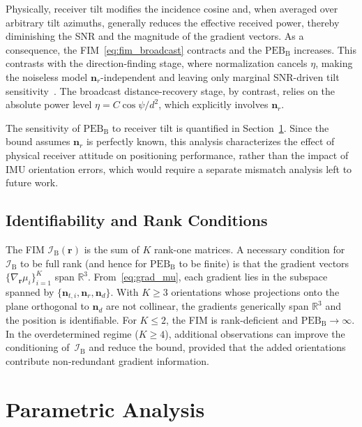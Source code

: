 \documentclass[conference]{IEEEtran}
\begin{document}
Physically, receiver tilt modifies the incidence cosine and, when averaged over arbitrary tilt azimuths, generally reduces the effective received power, thereby diminishing the SNR and the magnitude of the gradient vectors.
As a consequence, the FIM~\eqref{eq:fim_broadcast} contracts and the $\mathrm{PEB}_\mathrm{B}$ increases.
This contrasts with the direction-finding stage, where normalization cancels $\eta$, making the noiseless model $\mathbf{n}_r$-independent and leaving only marginal SNR-driven tilt sensitivity~\cite{AcunaTCOM2025}.
The broadcast distance-recovery stage, by contrast, relies on the absolute power level $\eta = C\cos\psi/d^2$, which explicitly involves $\mathbf{n}_r$.

The sensitivity of $\mathrm{PEB}_\mathrm{B}$ to receiver tilt is quantified in Section~\ref{sec:parametric}. Since the bound assumes $\mathbf{n}_r$ is perfectly known, this analysis characterizes the effect of physical receiver attitude on positioning performance, rather than the impact of IMU orientation errors, which would require a separate mismatch analysis left to future work.

\subsection{Identifiability and Rank Conditions}
\label{subsec:identifiability}

The FIM $\mathcal{I}_{\mathrm{B}}(\mathbf{r})$ is the sum of $K$ rank-one matrices.
A necessary condition for $\mathcal{I}_{\mathrm{B}}$ to be full rank (and hence for $\mathrm{PEB}_\mathrm{B}$ to be finite) is that the gradient vectors $\{\nabla_{\mathbf{r}}\mu_i\}_{i=1}^K$ span $\mathbb{R}^3$.
From~\eqref{eq:grad_mu}, each gradient lies in the subspace spanned by $\{\mathbf{n}_{t,i}, \mathbf{n}_r, \mathbf{n}_d\}$.
With $K\geq 3$ orientations whose projections onto the plane orthogonal to $\mathbf{n}_d$ are not collinear, the gradients generically span $\mathbb{R}^3$ and the position is identifiable.
For $K\leq 2$, the FIM is rank-deficient and $\mathrm{PEB}_\mathrm{B}\to\infty$.
In the overdetermined regime ($K\geq 4$), additional observations can improve the conditioning of~$\mathcal{I}_{\mathrm{B}}$ and reduce the bound, provided that the added orientations contribute non-redundant gradient information.

\section{Parametric Analysis}
\label{sec:parametric}
\end{document}
